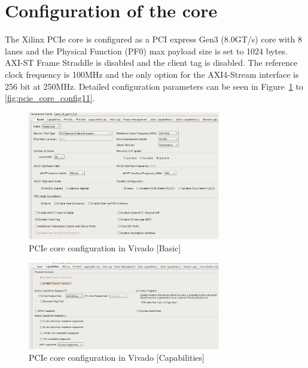 
\section{Configuration of the core}
\label{App:PcieCoreConfig}
The Xilinx PCIe core is configured as a PCI express Gen3 (8.0GT/s) core with 8 lanes and the Physical Function (PF0) max payload size is set to 1024 bytes. AXI-ST Frame Straddle is disabled and the client tag is disabled. The reference clock frequency is 100MHz and the only option for the AXI4-Stream interface is 256 bit at 250MHz. Detailed configuration parameters can be seen in Figure~\ref{fig:pcie_core_config1} to \ref{fig:pcie_core_config11}.

\begin{figure}[H]
\centering
\includegraphics[width=0.75\textwidth]{figures/pcie_core_config1.pdf}
\caption{PCIe core configuration in Vivado [Basic]}
\label{fig:pcie_core_config1}
\end{figure}

\begin{figure}[H]
\centering
\includegraphics[width=0.75\textwidth]{figures/pcie_core_config2.pdf}
\caption{PCIe core configuration in Vivado [Capabilities]}
\label{fig:pcie_core_config2}
\end{figure}

